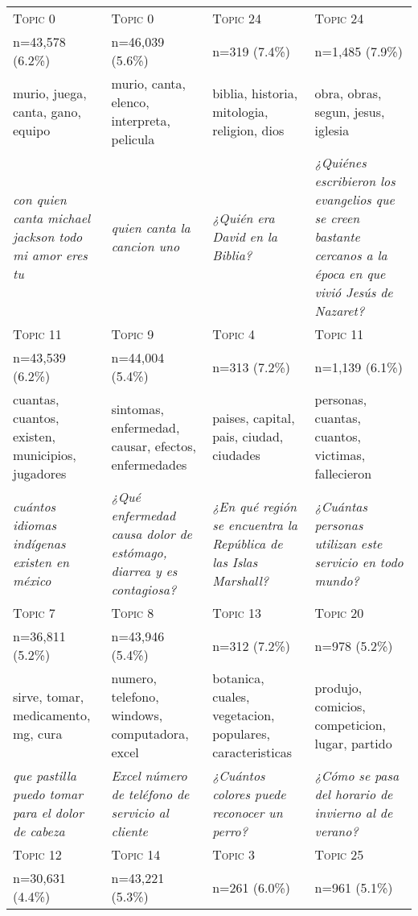 \begin{tabular}{|>{\centering\arraybackslash}m{3.5cm}|>{\centering\arraybackslash}m{3.5cm}|>{\centering\arraybackslash}m{3.5cm}|>{\centering\arraybackslash}m{3.5cm}|}
    \hline
    \textsc{Topic 0} & \textsc{Topic 0} & \textsc{Topic 24} & \textsc{Topic 24} \\
    n=43,578 (6.2\%) & n=46,039 (5.6\%) & n=319 (7.4\%) & n=1,485 (7.9\%) \\
    murio, juega, canta, gano, equipo & murio, canta, elenco, interpreta, pelicula & biblia, historia, mitologia, religion, dios & obra, obras, segun, jesus, iglesia \\
    \textit{con quien canta michael jackson todo mi amor eres tu} & \textit{quien canta la cancion uno} & \textit{¿Quién era David en la Biblia?} & \textit{¿Quiénes escribieron los evangelios que se creen bastante cercanos a la época en que vivió Jesús de Nazaret?} \\
    \hline
    \textsc{Topic 11} & \textsc{Topic 9} & \textsc{Topic 4} & \textsc{Topic 11} \\
    n=43,539 (6.2\%) & n=44,004 (5.4\%) & n=313 (7.2\%) & n=1,139 (6.1\%) \\
    cuantas, cuantos, existen, municipios, jugadores & sintomas, enfermedad, causar, efectos, enfermedades & paises, capital, pais, ciudad, ciudades & personas, cuantas, cuantos, victimas, fallecieron \\
    \textit{cuántos idiomas indígenas existen en méxico} & \textit{¿Qué enfermedad causa dolor de estómago, diarrea y es contagiosa?} & \textit{¿En qué región se encuentra la República de las Islas Marshall?} & \textit{¿Cuántas personas utilizan este servicio en todo mundo?} \\
    \hline
    \textsc{Topic 7} & \textsc{Topic 8} & \textsc{Topic 13} & \textsc{Topic 20} \\
    n=36,811 (5.2\%) & n=43,946 (5.4\%) & n=312 (7.2\%) & n=978 (5.2\%) \\
    sirve, tomar, medicamento, mg, cura & numero, telefono, windows, computadora, excel & botanica, cuales, vegetacion, populares, caracteristicas & produjo, comicios, competicion, lugar, partido \\
    \textit{que pastilla puedo tomar para el dolor de cabeza} & \textit{Excel número de teléfono de servicio al cliente} & \textit{¿Cuántos colores puede reconocer un perro?} & \textit{¿Cómo se pasa del horario de invierno al de verano?} \\
    \hline
    \textsc{Topic 12} & \textsc{Topic 14} & \textsc{Topic 3} & \textsc{Topic 25} \\
    n=30,631 (4.4\%) & n=43,221 (5.3\%) & n=261 (6.0\%) & n=961 (5.1\%) \\

\end{tabular}
